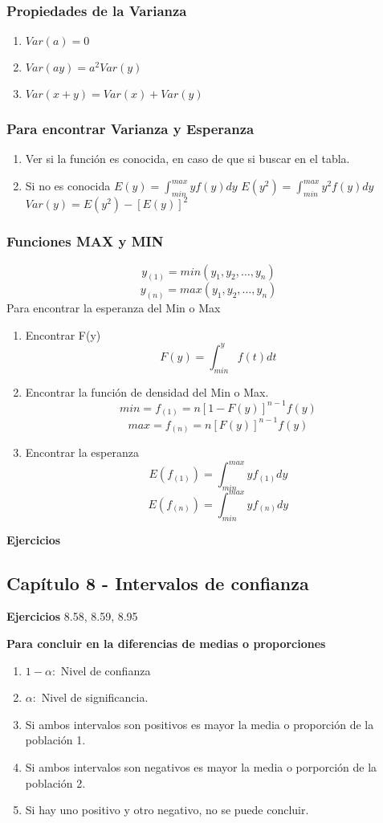 \subsubsection{Propiedades de la Varianza}
\begin{enumerate}
	\item $Var(a)=0$
	\item $Var(ay)=a^2Var(y)$
	\item $Var(x+y)=Var(x)+Var(y)$
\end{enumerate}

\subsubsection{Para encontrar Varianza y Esperanza}
\begin{enumerate}
	\item Ver si la función es conocida, en caso de que si buscar en el tabla.
	\item Si no es conocida $E(y)=\int_{min}^{max}yf(y)dy$ $E(y^2)=\int_{min}^{max}y^2f(y)dy$ $Var(y)=E(y^2)-[E(y)]^2$ 
\end{enumerate}

\subsubsection{Funciones MAX y MIN}
$$y_{(1)}=min(y_1,y_2,\dots,y_n)$$
$$y_{(n)}=max(y_1,y_2,\dots,y_n)$$
Para encontrar la esperanza del Min o Max

\begin{enumerate}
	\item Encontrar F(y)
	$$F(y)=\int_{min}^{y}f(t)dt$$
	\item Encontrar la función de densidad del Min o Max.
	$$min=f_{(1)}=n[1-F(y)]^{n-1}f(y)$$
	$$max=f_{(n)}=n[F(y)]^{n-1}f(y)$$
	\item Encontrar la esperanza
	$$E(f_{(1)})=\int_{min}^{max}yf_{(1)}dy$$
	$$E(f_{(n)})=\int_{min}^{max}yf_{(n)}dy$$
\end{enumerate}

\textbf{Ejercicios}

\subsection{Capítulo 8 - Intervalos de confianza}

\textbf{Ejercicios} 8.58, 8.59, 8.95

\textbf{Para concluir en la diferencias de medias o proporciones}
\begin{enumerate}
	\item $1-\alpha:$ Nivel de confianza
	\item $\alpha:$ Nivel de significancia.
	\item Si ambos intervalos son positivos es mayor la media o proporción de la población 1.
	\item Si ambos intervalos son negativos es mayor la media o porporción de la población 2.
	\item Si hay uno positivo y otro negativo, no se puede concluir.
\end{enumerate}

